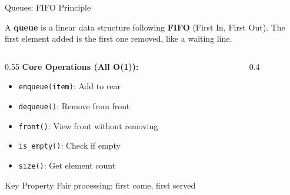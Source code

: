 \documentclass[aspectratio=169,xcolor=dvipsnames]{beamer}
\begin{document}
\begin{frame}{Queues: FIFO Principle}
  \begin{definition}
    A \textbf{queue} is a linear data structure following \textbf{FIFO} (First In, First Out). The first element added is the first one removed, like a waiting line.
  \end{definition}

  \vspace{0.3cm}

  \begin{columns}
    \begin{column}{0.55\textwidth}
      \textbf{Core Operations (All O(1)):}
      \begin{itemize}
        \item \texttt{enqueue(item)}: Add to rear
        \item \texttt{dequeue()}: Remove from front
        \item \texttt{front()}: View front without removing
        \item \texttt{is\_empty()}: Check if empty
        \item \texttt{size()}: Get element count
      \end{itemize}

      \vspace{0.3cm}

      \begin{alertblock}{Key Property}
        Fair processing: first come, first served
      \end{alertblock}
    \end{column}
    \begin{column}{0.4\textwidth}
    \end{column}
  \end{columns}
\end{frame}
\end{document}
